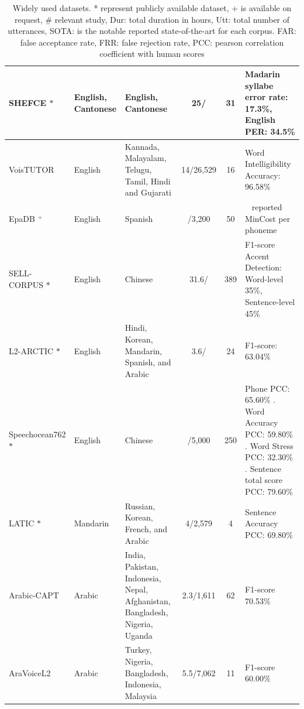 \documentclass[11pt]{article}
\begin{document}
\begin{table}[!ht]
{\begin{tabular}{p{3.5cm}p{2cm}p{4cm}ccp{6cm}}
    SHEFCE \cite{shefce} $\ast$ & English, Cantonese & English, Cantonese & 25/ & 31 & Madarin syllabe error rate: 17.3\%, English PER: 34.5\% \cite{7953273} \\    \midrule
    VoisTUTOR \cite{voistutor, 9997873}  & English & Kannada, Malayalam, Telugu, Tamil, Hindi and Gujarati & 14/26,529 & 16 & Word Intelligibility Accuracy: 96.58\% \cite{anand2023unsupervised}\\    \midrule
    EpaDB \cite{epadb} $^+$ & English & Spanish &  /3,200 & 50 & \ \cite{9747727} reported MinCost per phoneme \\    \midrule
    SELL-CORPUS  \cite{sell-corpus} $\ast$ & English & Chinese & 31.6/ & 389 &  F1-score Accent Detection: Word-level 35\%, Sentence-level 45\% \cite{kyriakopoulos2020automatic} \\\midrule
    L2-ARCTIC  \cite{L2-ARCTIC} $\ast$ & English & Hindi, Korean, Mandarin, Spanish, and Arabic & 3.6/ & 24  & F1-score: 63.04\% \cite{lin2022phoneme} \\       \midrule
    Speechocean762 \cite{speechocean762} $\ast$  & English & Chinese & /5,000 & 250 & Phone PCC: 65.60\%  \cite{3M}. Word Accuracy PCC: 59.80\% \cite{3M}. Word Stress PCC: 32.30\% \cite{10095733}. Sentence total score PCC: 79.60\% \cite{3M} \\  \midrule
    LATIC \cite{mqtj-qh10-21} $\ast$ & Mandarin & Russian, Korean, French, and Arabic & 4/2,579 & 4 & Sentence Accuracy PCC: 69.80\% \cite{lin2023multi} \\\midrule
    Arabic-CAPT \cite{algabri2022mispronunciation} & Arabic & India, Pakistan, Indonesia, Nepal, Afghanistan, Bangladesh, Nigeria, Uganda & 2.3/1,611 & 62 & F1-score 70.53\% \cite{algabri2022mispronunciation}\\ \midrule
    AraVoiceL2 \cite{speechblender} & Arabic & Turkey, Nigeria, Bangladesh, Indonesia, Malaysia & 5.5/7,062 & 11 & F1-score 60.00\% \cite{speechblender}\\
    \midrule
    \midrule
  \end{tabular}
  }
    \caption{Widely used datasets. * represent publicly available dataset, + is available on request, \# relevant study, Dur: total duration in hours, Utt: total number of utterances, SOTA: is the notable reported state-of-the-art for each corpus. FAR: false acceptance rate, FRR: false rejection rate, PCC: pearson correlation coefficient with human scores} %
    \label{tab:datasets}
    \vspace{-0.3cm}
\end{table}
\end{document}
